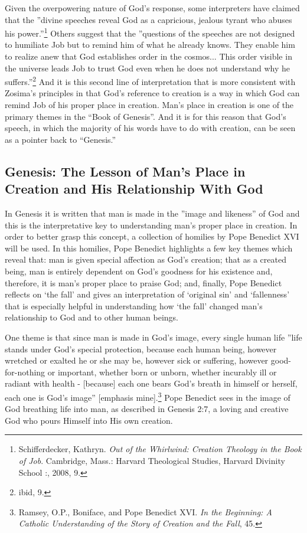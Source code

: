 Given the overpowering nature of God's response, some interpreters have claimed that the ''divine speeches reveal God as a capricious, jealous tyrant who abuses his power.''\footnote{Schifferdecker, Kathryn. \emph{Out of the Whirlwind: Creation Theology in the Book of Job}. Cambridge, Mass.: Harvard Theological Studies, Harvard Divinity School :, 2008, 9.} Others suggest that the ''questions of the speeches are not designed to humiliate Job but to remind him of what he already knows. They enable him to realize anew that God establishes order in the cosmos... This order visible in the universe leads Job to trust God even when he does not understand why he suffers.''\footnote{ibid, 9.} And it is this second line of interpretation that is more consistent with Zosima's principles in that God's reference to creation is a way in which God can remind Job of his proper place in creation. Man's place in creation is one of the primary themes in the ``Book of Genesis''. And it is for this reason that God's speech, in which the majority of his words have to do with creation, can be seen as a pointer back to ``Genesis.''

\subsection{Genesis: The Lesson of Man's Place in Creation and His Relationship With God}
In Genesis it is written that man is made in the ''image and likeness'' of God and this is the interpretative key to understanding man's proper place in creation. In order to better grasp this concept, a collection of homilies by Pope Benedict XVI will be used. In this homilies, Pope Benedict highlights a few key themes which reveal that: man is given special affection as God's creation; that as a created being, man is entirely dependent on God's goodness for his existence and, therefore, it is man's proper place to praise God; and, finally, Pope Benedict reflects on `the fall' and gives an interpretation of `original sin' and `fallenness' that is especially helpful in understanding how `the fall' changed man's relationship to God and to other human beings. 

One theme is that since man is made in God's image, every single human life ''life stands under God's special protection, because each human being, however wretched or exalted he or she may be, however sick or suffering, however good-for-nothing or important, whether born or unborn, whether incurably ill or radiant with health - [because] each one bears God's breath in himself or herself, each one is God's image'' [emphasis mine].\footnote{Ramsey, O.P., Boniface, and Pope Benedict XVI. \emph{In the Beginning: A Catholic Understanding of the Story of Creation and the Fall}, 45.} Pope Benedict sees in the image of God breathing life into man, as described in Genesis 2:7, a loving and creative God who pours Himself into His own creation. 

